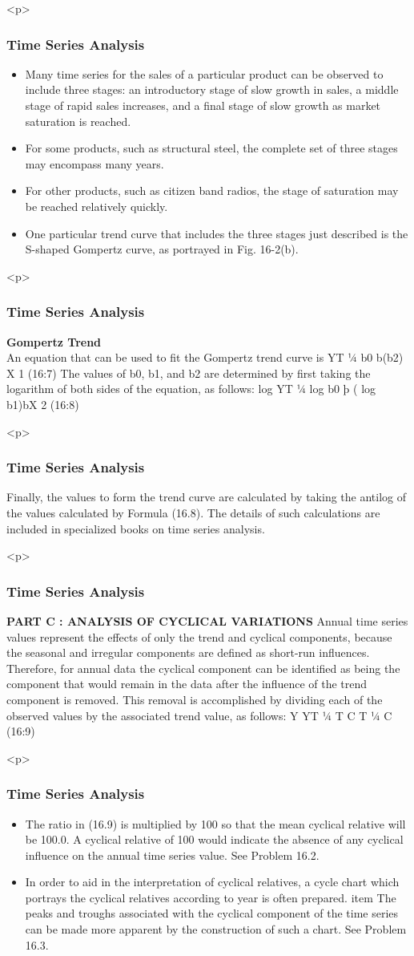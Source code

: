 \documentclass{beamer}
\begin{document}
\begin{itemize}
<p>
\frametitle{Time Series Analysis}
\begin{itemize}
\item Many time series for the sales of a particular product can be observed to include three stages: an
introductory stage of slow growth in sales, a middle stage of rapid sales increases, and a final stage of slow
growth as market saturation is reached.
\item For some products, such as structural steel, the complete set of three
stages may encompass many years. 
\item For other products, such as citizen band radios, the stage of saturation may
be reached relatively quickly. 
\item One particular trend curve that includes the three stages just described is the
S-shaped Gompertz curve, as portrayed in Fig. 16-2(b). 
\end{itemize}

<p>
\frametitle{Time Series Analysis}
\textbf{Gompertz Trend}\\
An equation that can be used to fit the Gompertz trend
curve is
YT ¼ b0 b(b2) X
1 (16:7)
The values of b0, b1, and b2 are determined by first taking the logarithm of both sides of the equation, as
follows:
log YT ¼ log b0 þ ( log b1)bX
2 (16:8)


<p>
\frametitle{Time Series Analysis}
Finally, the values to form the trend curve are calculated by taking the antilog of the values calculated
by Formula (16.8). The details of such calculations are included in specialized books on time series
analysis.


<p>
\frametitle{Time Series Analysis}
\textbf{PART C : ANALYSIS OF CYCLICAL VARIATIONS}
Annual time series values represent the effects of only the trend and cyclical components, because the
seasonal and irregular components are defined as short-run influences. Therefore, for annual data the
cyclical component can be identified as being the component that would remain in the data after the influence of
the trend component is removed. This removal is accomplished by dividing each of the observed values by the
associated trend value, as follows:
Y
YT
¼
T   C
T
¼ C (16:9)

<p>
\frametitle{Time Series Analysis}
\begin{itemize}
\item The ratio in (16.9) is multiplied by 100 so that the mean cyclical relative will be 100.0. A cyclical relative
of 100 would indicate the absence of any cyclical influence on the annual time series value. See Problem 16.2.
\item In order to aid in the interpretation of cyclical relatives, a cycle chart which portrays the cyclical relatives
according to year is often prepared. 
item The peaks and troughs associated with the cyclical component of the time
series can be made more apparent by the construction of such a chart. See Problem 16.3.
\end{itemize}


\end{itemize}
\end{document}
